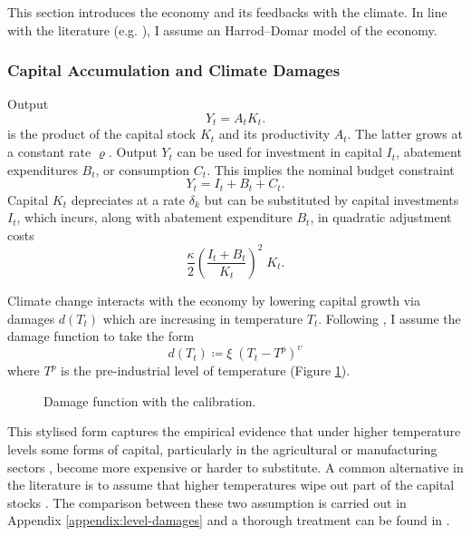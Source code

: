 \documentclass[../../main.tex]{subfiles}
\begin{document}
This section introduces the economy and its feedbacks with the climate. In line with the literature (e.g. \citealt{barro_welfare_2006, pindyck_economic_2013,hambel_optimal_2021}), I assume an Harrod–Domar model of the economy.   

\subsubsection{Capital Accumulation and Climate Damages}

Output \begin{equation}
    Y_t = A_t K_t.
\end{equation} is the product of the capital stock $K_t$ and its productivity $A_t$. The latter grows at a constant rate $\varrho$. Output $Y_t$ can be used for investment in capital $I_t$, abatement expenditures $B_t$, or consumption $C_t$. This implies the nominal budget constraint \begin{equation} \label{eq:nominal-budget}
    Y_t = I_t + B_t + C_t.
\end{equation} Capital $K_t$ depreciates at a rate $\delta_k$ but can be substituted by capital investments $I_t$, which incurs, along with abatement expenditure $B_t$, in quadratic adjustment costs \begin{equation} \label{eq:adjustment-costs}
    \frac{\kappa}{2} \left( \frac{I_t + B_t}{K_t} \right)^2  \; K_t.
\end{equation}

Climate change interacts with the economy by lowering capital growth via damages $d(T_t)$ which are increasing in temperature $T_t$. Following \cite{weitzman_ghg_2012}, I assume the damage function to take the form \begin{equation}
    d(T_t) \coloneqq \xi \; (T_t - T^p)^{\upsilon}
\end{equation} where $T^p$ is the pre-industrial level of temperature (Figure \ref{fig:damage}). \begin{figure}[htbp]
    \centering
    
    \caption{Damage function with the \cite{weitzman_ghg_2012} calibration.}
    \label{fig:damage}
\end{figure} \noindent This stylised form captures the empirical evidence that under higher temperature levels some forms of capital, particularly in the agricultural \citep{dietz_growth_2019} or manufacturing sectors \citep{dell_temperature_2009,dell_temperature_2012}, become more expensive or harder to substitute. A common alternative in the literature is to assume that higher temperatures wipe out part of the capital stocks \citep{nordhaus_optimal_1992}. The comparison between these two assumption is carried out in Appendix \ref{appendix:level-damages} and a thorough treatment can be found in \cite{hambel_optimal_2021}. 
\end{document}
